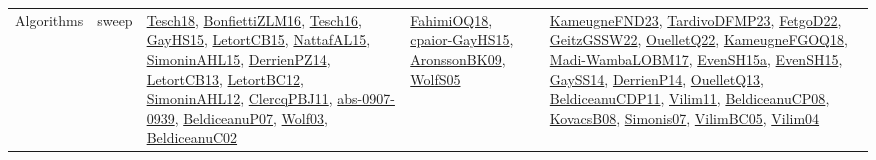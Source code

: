 {\begin{longtable}{lp{3cm}>{\raggedright}p{6cm}>{\raggedright}p{6cm}p{8cm}}
Algorithms & sweep & \href{papers/Tesch18.pdf}{Tesch18}\cite{Tesch18}, \href{papers/BonfiettiZLM16.pdf}{BonfiettiZLM16}\cite{BonfiettiZLM16}, \href{papers/Tesch16.pdf}{Tesch16}\cite{Tesch16}, \href{papers/GayHS15.pdf}{GayHS15}\cite{GayHS15}, \href{articles/LetortCB15.pdf}{LetortCB15}\cite{LetortCB15}, \href{articles/NattafAL15.pdf}{NattafAL15}\cite{NattafAL15}, \href{articles/SimoninAHL15.pdf}{SimoninAHL15}\cite{SimoninAHL15}, \href{papers/DerrienPZ14.pdf}{DerrienPZ14}\cite{DerrienPZ14}, \href{papers/LetortCB13.pdf}{LetortCB13}\cite{LetortCB13}, \href{papers/LetortBC12.pdf}{LetortBC12}\cite{LetortBC12}, \href{papers/SimoninAHL12.pdf}{SimoninAHL12}\cite{SimoninAHL12}, \href{papers/ClercqPBJ11.pdf}{ClercqPBJ11}\cite{ClercqPBJ11}, \href{articles/abs-0907-0939.pdf}{abs-0907-0939}\cite{abs-0907-0939}, \href{papers/BeldiceanuP07.pdf}{BeldiceanuP07}\cite{BeldiceanuP07}, \href{papers/Wolf03.pdf}{Wolf03}\cite{Wolf03}, \href{papers/BeldiceanuC02.pdf}{BeldiceanuC02}\cite{BeldiceanuC02} & \href{articles/FahimiOQ18.pdf}{FahimiOQ18}\cite{FahimiOQ18}, \href{papers/cpaior-GayHS15.pdf}{cpaior-GayHS15}\cite{cpaior-GayHS15}, \href{papers/AronssonBK09.pdf}{AronssonBK09}\cite{AronssonBK09}, \href{papers/WolfS05.pdf}{WolfS05}\cite{WolfS05} & \href{papers/KameugneFND23.pdf}{KameugneFND23}\cite{KameugneFND23}, \href{papers/TardivoDFMP23.pdf}{TardivoDFMP23}\cite{TardivoDFMP23}, \href{articles/FetgoD22.pdf}{FetgoD22}\cite{FetgoD22}, \href{papers/GeitzGSSW22.pdf}{GeitzGSSW22}\cite{GeitzGSSW22}, \href{papers/OuelletQ22.pdf}{OuelletQ22}\cite{OuelletQ22}, \href{papers/KameugneFGOQ18.pdf}{KameugneFGOQ18}\cite{KameugneFGOQ18}, \href{papers/Madi-WambaLOBM17.pdf}{Madi-WambaLOBM17}\cite{Madi-WambaLOBM17}, \href{articles/EvenSH15a.pdf}{EvenSH15a}\cite{EvenSH15a}, \href{papers/EvenSH15.pdf}{EvenSH15}\cite{EvenSH15}, \href{papers/GaySS14.pdf}{GaySS14}\cite{GaySS14}, \href{papers/DerrienP14.pdf}{DerrienP14}\cite{DerrienP14}, \href{papers/OuelletQ13.pdf}{OuelletQ13}\cite{OuelletQ13}, \href{articles/BeldiceanuCDP11.pdf}{BeldiceanuCDP11}\cite{BeldiceanuCDP11}, \href{papers/Vilim11.pdf}{Vilim11}\cite{Vilim11}, \href{papers/BeldiceanuCP08.pdf}{BeldiceanuCP08}\cite{BeldiceanuCP08}, \href{articles/KovacsB08.pdf}{KovacsB08}\cite{KovacsB08}, \href{articles/Simonis07.pdf}{Simonis07}\cite{Simonis07}, \href{articles/VilimBC05.pdf}{VilimBC05}\cite{VilimBC05}, \href{papers/Vilim04.pdf}{Vilim04}\cite{Vilim04}\\

\end{longtable}}
